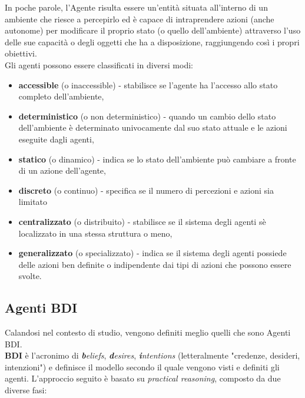 \documentclass[12pt,a4paper,openright,oneside]{report}
\begin{document}
In poche parole, l'Agente risulta essere un'entità situata all'interno di un ambiente che riesce a percepirlo ed è capace di intraprendere azioni (anche autonome) per modificare il proprio stato (o quello dell'ambiente) attraverso l'uso delle sue capacità o degli oggetti che ha a disposizione, raggiungendo così i propri obiettivi.\\

Gli agenti possono essere classificati in diversi modi:
\begin{itemize}
	\item \textbf{accessible} (o inaccessible) - stabilisce se l'agente ha l'accesso allo stato completo dell'ambiente,
	
	\item \textbf{deterministico} (o non deterministico) - quando un cambio dello stato dell'ambiente è determinato univocamente dal suo stato attuale e le azioni eseguite dagli agenti,
	
	\item \textbf{statico} (o dinamico) - indica se lo stato dell'ambiente può cambiare a fronte di un azione dell'agente,
	
	\item \textbf{discreto} (o continuo) - specifica se il numero di percezioni e azioni sia limitato
	
	\item \textbf{centralizzato} (o distribuito) - stabilisce se il sistema degli agenti sè localizzato in una stessa struttura o meno,
	
	\item \textbf{generalizzato} (o specializzato) - indica se il sistema degli agenti  possiede delle azioni ben definite o indipendente dai tipi di azioni che possono essere svolte.
\end{itemize}


\subsection{Agenti BDI}
Calandosi nel contesto di studio, vengono definiti meglio quelli che sono Agenti BDI.\\

\textbf{BDI} è l'acronimo di \textit{\textbf{b}eliefs}, \textit{\textbf{d}esires}, \textit{\textbf{i}ntentions} (letteralmente "credenze, desideri, intenzioni") e definisce il modello secondo il quale vengono visti e definiti gli agenti. L'approccio seguito è basato su \textit{practical reasoning}, composto da due diverse fasi:
\end{document}
